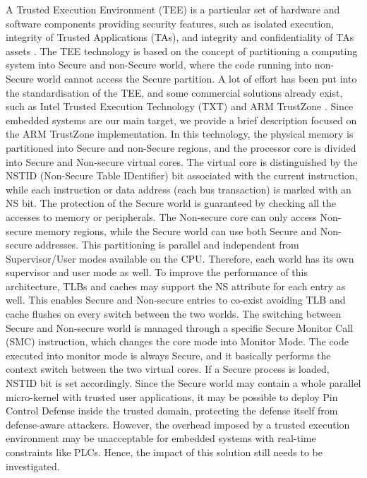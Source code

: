 A Trusted Execution Environment (TEE) is a particular set of hardware and software components providing security features,
such as isolated execution, integrity of Trusted Applications (TAs), and integrity and confidentiality of TAs assets \cite{tee}.
The TEE technology is based on the concept of partitioning a computing system into Secure and non-Secure world, where
the code running into non-Secure world cannot access the Secure partition.
A lot of effort has been put into the standardisation of the TEE, and some commercial solutions already exist,
such as Intel Trusted Execution Technology (TXT) \cite{intel_txt} and ARM TrustZone \cite{trustzone}.
Since embedded systems are our main target, we provide a brief description focused on the ARM TrustZone implementation.
In this technology, the physical memory is partitioned into Secure and non-Secure regions, and the processor core is divided into Secure and Non-secure virtual cores.
The virtual core is distinguished by the NSTID (Non-Secure Table IDentifier) bit associated with the current instruction,
while each instruction or data address (\ie each bus transaction) is marked with an NS bit.
The protection of the Secure world is guaranteed by checking all the accesses to memory or peripherals.
The Non-secure core can only access Non-secure memory regions, while the Secure world can use both Secure and Non-secure addresses.
This partitioning is parallel and independent from Supervisor/User modes available on the CPU. Therefore, each world has its own supervisor and user mode as well.
To improve the performance of this architecture, TLBs and caches may support the NS attribute for each entry as well.
This enables Secure and Non-secure entries to co-exist avoiding TLB and cache flushes on every switch between the two worlds.
The switching between Secure and Non-secure world is managed through a specific Secure Monitor Call (SMC) instruction,
which changes the core mode into Monitor Mode. The code executed into monitor mode is always Secure, and it basically performs the context switch
between the two virtual cores. If a Secure process is loaded, NSTID bit is set accordingly.
Since the Secure world may contain a whole parallel micro-kernel with trusted user applications, it may be possible
to deploy Pin Control Defense inside the trusted domain, protecting the defense itself from defense-aware attackers.
However, the overhead imposed by a trusted execution environment may be unacceptable for embedded systems with real-time constraints like PLCs.
Hence, the impact of this solution still needs to be investigated.


